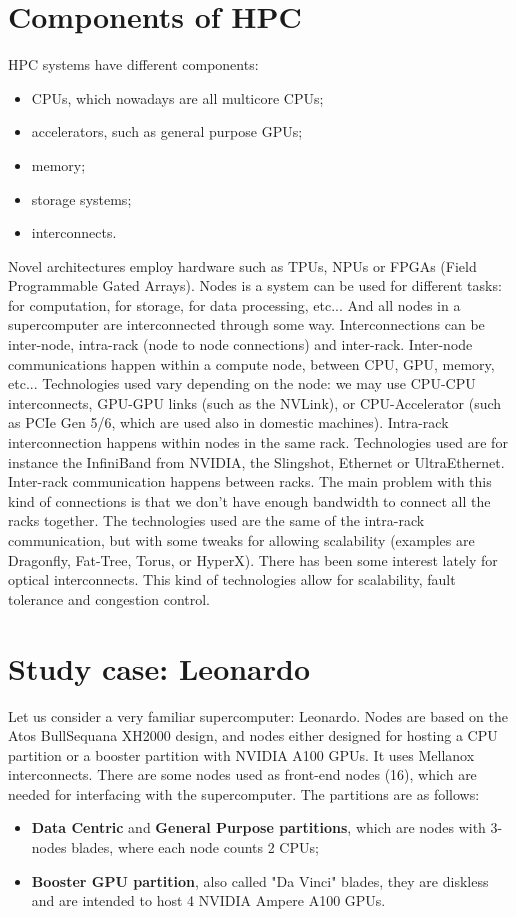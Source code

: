 \section{Components of HPC}

HPC systems have different components:
\begin{itemize}
    \item CPUs, which nowadays are all multicore CPUs;
    \item accelerators, such as general purpose GPUs;
    \item memory;
    \item storage systems;
    \item interconnects.
\end{itemize}

Novel architectures employ hardware such as TPUs, NPUs or FPGAs (Field Programmable Gated Arrays).
\nwl
Nodes is a system can be used for different tasks: for computation, for storage, for data processing, etc... And all nodes in a supercomputer are interconnected through some way. Interconnections can be inter-node, intra-rack (node to node connections) and inter-rack. 
\nwl
Inter-node communications happen within a compute node, between CPU, GPU, memory, etc... Technologies used vary depending on the node: we may use CPU-CPU interconnects, GPU-GPU links (such as the NVLink), or CPU-Accelerator (such as PCIe Gen 5/6, which are used also in domestic machines).
\nwl
Intra-rack interconnection happens within nodes in the same rack. Technologies used are for instance the InfiniBand from NVIDIA, the Slingshot, Ethernet or UltraEthernet.
\nwl
Inter-rack communication happens between racks. The main problem with this kind of connections is that we don't have enough bandwidth to connect all the racks together. The technologies used are the same of the intra-rack communication, but with some tweaks for allowing scalability (examples are Dragonfly, Fat-Tree, Torus, or HyperX). There has been some interest lately for optical interconnects. This kind of technologies allow for scalability, fault tolerance and congestion control.

\section{Study case: Leonardo}

Let us consider a very familiar supercomputer: Leonardo. Nodes are based on the Atos BullSequana XH2000 design, and nodes either designed for hosting a CPU partition or a booster partition with NVIDIA A100 GPUs. It uses Mellanox interconnects.
\nwl
There are some nodes used as front-end nodes (16), which are needed for interfacing with the supercomputer. The partitions are as follows:
\begin{itemize}
    \item \textbf{Data Centric} and \textbf{General Purpose partitions}, which are nodes with 3-nodes blades, where each node counts 2 CPUs;
    \item \textbf{Booster GPU partition}, also called "Da Vinci" blades, they are diskless and are intended to host 4 NVIDIA Ampere A100 GPUs.
\end{itemize}

